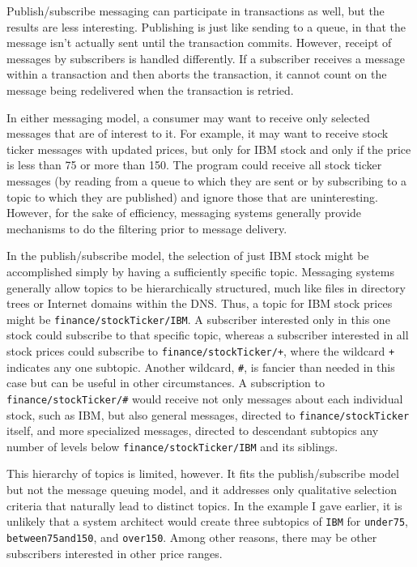Publish/subscribe messaging can participate in transactions as well,
but the results are less interesting.  Publishing is just like sending
to a queue, in that the message isn't actually sent until the
transaction commits.  However, receipt of messages by subscribers is
handled differently.  If a subscriber receives a message within a
transaction and then aborts the transaction, it cannot count on the
message being redelivered when the transaction is retried.

In either messaging model, a consumer may want to receive only
selected messages that are of interest to it.  For example, it may
want to receive stock ticker messages with updated prices, but only
for IBM stock and only if the price is less than 75 or more than 150.
The program could receive all stock ticker messages (by reading from a
queue to which they are sent or by subscribing to a topic to which
they are published) and ignore those that are uninteresting.
However, for the sake of efficiency, messaging systems generally
provide mechanisms to do the filtering prior to message delivery.

In the publish/subscribe model, the selection of just IBM stock might
be accomplished simply by having a sufficiently specific topic.
Messaging systems generally allow topics to be hierarchically
structured, much like files in directory trees or Internet domains
within the DNS.  Thus, a topic for IBM stock prices might be
\verb|finance/stockTicker/IBM|.  A subscriber interested only in this
one stock could subscribe to that specific topic, whereas a subscriber
interested in all stock prices could subscribe to
\verb|finance/stockTicker/+|, where the wildcard \verb|+| indicates
any one subtopic.  Another wildcard, \verb|#|, is fancier than needed
in this case but can be useful in other circumstances.  A
subscription to \verb|finance/stockTicker/#| would receive not only
messages about each individual stock, such as IBM, but also general
messages, directed to \verb|finance/stockTicker| itself, and more
specialized messages, directed to descendant subtopics any number of
levels below \verb|finance/stockTicker/IBM| and its siblings.

This hierarchy of topics is limited, however.  It fits the
publish/subscribe model but not the message queuing  model, and
it addresses only
qualitative selection criteria that naturally lead to distinct
topics.  In the example I gave earlier, it is unlikely that a system
architect would create three subtopics of \verb|IBM| for
\verb|under75|, \verb|between75and150|, and \verb|over150|.  Among
other reasons, there may be other subscribers interested in other price
ranges.

